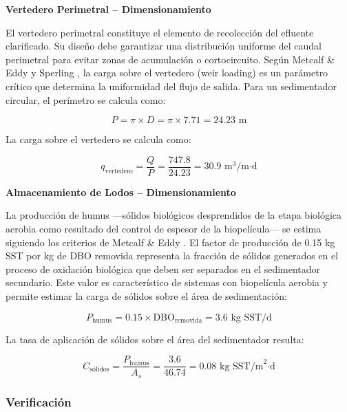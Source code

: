 \documentclass[12pt,a4paper]{article}
\begin{document}
\textbf{Vertedero Perimetral -- Dimensionamiento}

El vertedero perimetral constituye el elemento de recolección del efluente clarificado. Su diseño debe garantizar una distribución uniforme del caudal perimetral para evitar zonas de acumulación o cortocircuito. Según Metcalf \& Eddy \cite{metcalf2014} y Sperling \cite{sperling2007}, la carga sobre el vertedero (weir loading) es un parámetro crítico que determina la uniformidad del flujo de salida. Para un sedimentador circular, el perímetro se calcula como:

\begin{equation}
P = \pi \times D = \pi \times 7.71 = 24.23 \text{ m}
\end{equation}

La carga sobre el vertedero se calcula como:

\begin{equation}
q_{\text{vertedero}} = \frac{Q}{P} = \frac{747.8}{24.23} = 30.9 \text{ m}^3\text{/m·d}
\end{equation}

\textbf{Almacenamiento de Lodos -- Dimensionamiento}

La producción de humus —sólidos biológicos desprendidos de la etapa biológica aerobia como resultado del control de espesor de la biopelícula— se estima siguiendo los criterios de Metcalf \& Eddy \cite{metcalf2014}. El factor de producción de 0.15 kg SST por kg de DBO removida representa la fracción de sólidos generados en el proceso de oxidación biológica que deben ser separados en el sedimentador secundario. Este valor es característico de sistemas con biopelícula aerobia y permite estimar la carga de sólidos sobre el área de sedimentación:

\begin{equation}
P_{\text{humus}} = 0.15 \times \text{DBO}_{\text{removida}} = 3.6 \text{ kg SST/d}
\end{equation}

La tasa de aplicación de sólidos sobre el área del sedimentador resulta:

\begin{equation}
C_{\text{sólidos}} = \frac{P_{\text{humus}}}{A_s} = \frac{3.6}{46.74} = 0.08 \text{ kg SST/m}^2\text{·d}
\end{equation}

\subsubsection{Verificación}
\end{document}

